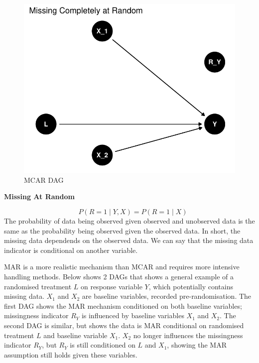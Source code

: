 \documentclass{article}
\newcommand{\pandocbounded}[1]{#1}
\begin{document}
\begin{figure}
\centering
\pandocbounded{\includegraphics[keepaspectratio]{Final_Report_files/figure-latex/unnamed-chunk-1-1.pdf}}
\caption{MCAR DAG}
\end{figure}

\textbf{Missing At Random}

\[\quad P(R = 1 \mid Y, X) = P(R = 1 \mid X)\] The probability of data
being observed given observed and unobserved data is the same as the
probability being observed given the observed data. In short, the
missing data dependends on the observed data. We can say that the
missing data indicator is conditional on another variable.

MAR is a more realistic mechanism than MCAR and requires more intensive
handling methods. Below shows 2 DAGs that shows a general example of a
randomised treatment \(L\) on response variable \(Y\), which potentially
contains missing data. \(X_1\) and \(X_2\) are baseline variables,
recorded pre-randomisation. The first DAG shows the MAR mechanism
conditioned on both baseline variables; missingness indicator \(R_Y\) is
influenced by baseline variables \(X_1\) and \(X_2\). The second DAG is
similar, but shows the data is MAR conditional on randomised treatment
\(L\) and baseline variable \(X_1\). \(X_2\) no longer influences the
missingness indicator \(R_Y\), but \(R_Y\) is still conditioned on \(L\)
and \(X_1\), showing the MAR assumption still holds given these
variables.
\end{document}
